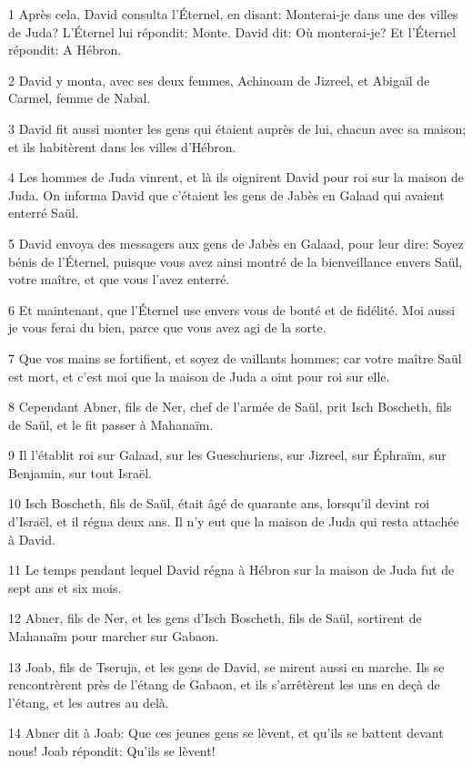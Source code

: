 \par 1 Après cela, David consulta l'Éternel, en disant: Monterai-je dans une des villes de Juda? L'Éternel lui répondit: Monte. David dit: Où monterai-je? Et l'Éternel répondit: A Hébron.
\par 2 David y monta, avec ses deux femmes, Achinoam de Jizreel, et Abigaïl de Carmel, femme de Nabal.
\par 3 David fit aussi monter les gens qui étaient auprès de lui, chacun avec sa maison; et ils habitèrent dans les villes d'Hébron.
\par 4 Les hommes de Juda vinrent, et là ils oignirent David pour roi sur la maison de Juda. On informa David que c'étaient les gens de Jabès en Galaad qui avaient enterré Saül.
\par 5 David envoya des messagers aux gens de Jabès en Galaad, pour leur dire: Soyez bénis de l'Éternel, puisque vous avez ainsi montré de la bienveillance envers Saül, votre maître, et que vous l'avez enterré.
\par 6 Et maintenant, que l'Éternel use envers vous de bonté et de fidélité. Moi aussi je vous ferai du bien, parce que vous avez agi de la sorte.
\par 7 Que vos mains se fortifient, et soyez de vaillants hommes; car votre maître Saül est mort, et c'est moi que la maison de Juda a oint pour roi sur elle.
\par 8 Cependant Abner, fils de Ner, chef de l'armée de Saül, prit Isch Boscheth, fils de Saül, et le fit passer à Mahanaïm.
\par 9 Il l'établit roi sur Galaad, sur les Gueschuriens, sur Jizreel, sur Éphraïm, sur Benjamin, sur tout Israël.
\par 10 Isch Boscheth, fils de Saül, était âgé de quarante ans, lorsqu'il devint roi d'Israël, et il régna deux ans. Il n'y eut que la maison de Juda qui resta attachée à David.
\par 11 Le temps pendant lequel David régna à Hébron sur la maison de Juda fut de sept ans et six mois.
\par 12 Abner, fils de Ner, et les gens d'Isch Boscheth, fils de Saül, sortirent de Mahanaïm pour marcher sur Gabaon.
\par 13 Joab, fils de Tseruja, et les gens de David, se mirent aussi en marche. Ils se rencontrèrent près de l'étang de Gabaon, et ils s'arrêtèrent les uns en deçà de l'étang, et les autres au delà.
\par 14 Abner dit à Joab: Que ces jeunes gens se lèvent, et qu'ils se battent devant nous! Joab répondit: Qu'ils se lèvent!
